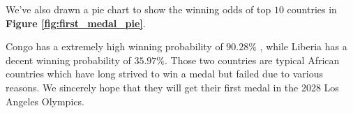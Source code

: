 We've also drawn a pie chart to show the winning odds of top $10$ countries in \textbf{Figure \ref{fig:first_medal_pie}}. 

Congo has a extremely high winning probability of $90.28\%$ , while Liberia has a decent winning probability of $35.97\%$. Those two countries are typical African countries which have long strived to win a medal but failed due to various reasons. We sincerely hope that they will get their first medal in the 2028 Los Angeles Olympics.